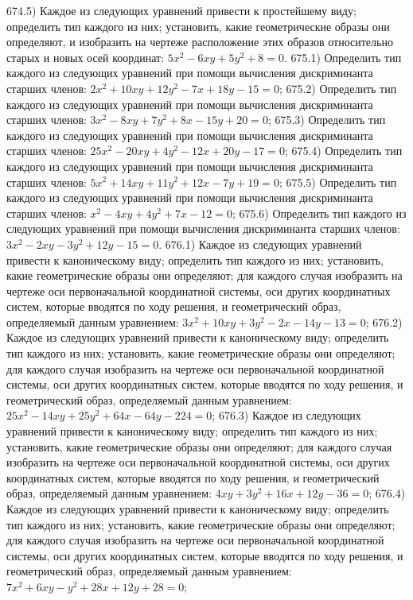 674.5) Каждое из следующих уравнений привести к простейшему виду; определить тип каждого из них; установить, какие геометрические образы они определяют, и изобразить на чертеже расположение этих образов относительно старых и новых осей координат: $5 x^2-6 x y+5 y^2+8=0$.
675.1) Определить тип каждого из следующих уравнений при помощи вычисления дискриминанта старших членов: $2 x^2+10 x y+12 y^2-7 x+18 y-15=0$;
675.2) Определить тип каждого из следующих уравнений при помощи вычисления дискриминанта старших членов: $3 x^2-8 x y+7 y^2+8 x-15 y+20=0$;
675.3) Определить тип каждого из следующих уравнений при помощи вычисления дискриминанта старших членов: $25 x^2-20 x y+4 y^2-12 x+20 y-17=0$;
675.4) Определить тип каждого из следующих уравнений при помощи вычисления дискриминанта старших членов: $5 x^2+14 x y+11 y^2+12 x-7 y+19=0$;
675.5) Определить тип каждого из следующих уравнений при помощи вычисления дискриминанта старших членов: $x^2-4 x y+4 y^2+7 x-12=0$;
675.6) Определить тип каждого из следующих уравнений при помощи вычисления дискриминанта старших членов: $3 x^2-2 x y-3 y^2+12 y-15=0$.
676.1) Каждое из следующих уравнений привести к каноническому виду; определить тип каждого из них; установить, какие геометрические образы они определяют; для каждого случая изобразить на чертеже оси первоначальной координатной системы, оси других координатных систем, которые вводятся по ходу решения, и геометрический образ, определяемый данным уравнением: $3 x^2+10 x y+3 y^2-2 x-14 y-13=0$;
676.2) Каждое из следующих уравнений привести к каноническому виду; определить тип каждого из них; установить, какие геометрические образы они определяют; для каждого случая изобразить на чертеже оси первоначальной координатной системы, оси других координатных систем, которые вводятся по ходу решения, и геометрический образ, определяемый данным уравнением: $25 x^2-14 x y+25 y^2+64 x-64 y-224=0$;
676.3) Каждое из следующих уравнений привести к каноническому виду; определить тип каждого из них; установить, какие геометрические образы они определяют; для каждого случая изобразить на чертеже оси первоначальной координатной системы, оси других координатных систем, которые вводятся по ходу решения, и геометрический образ, определяемый данным уравнением: $4 x y+3 y^2+16 x+12 y-36=0$;
676.4) Каждое из следующих уравнений привести к каноническому виду; определить тип каждого из них; установить, какие геометрические образы они определяют; для каждого случая изобразить на чертеже оси первоначальной координатной системы, оси других координатных систем, которые вводятся по ходу решения, и геометрический образ, определяемый данным уравнением: $7 x^2+6 x y-y^2+28 x+12 y+28=0$;
